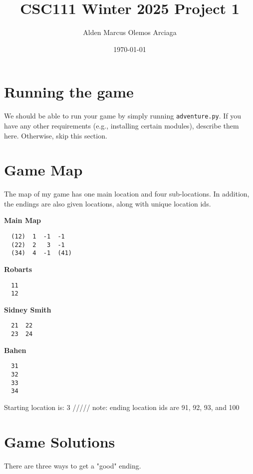\documentclass[11pt]{article}
\title{CSC111 Winter 2025 Project 1}
\author{Alden Marcus Olemos Arciaga}
\date{\today}
\begin{document}
\maketitle

\section*{Running the game}
We should be able to run your game by simply running \texttt{adventure.py}. If you have any other requirements (e.g., installing certain modules), describe them here. Otherwise, skip this section.

\section*{Game Map}
The map of my game has one main location and four sub-locations. In addition, the endings are also given locations, along with unique location ids.

\vspace{\baselineskip}

\begin{minipage}[t]{0.24\textwidth}
    \textbf{Main Map}
    \begin{verbatim}
  (12)  1  -1  -1
  (22)  2   3  -1
  (34)  4  -1  (41)
    \end{verbatim}
\end{minipage}%
\hfill
\begin{minipage}[t]{0.24\textwidth}
    \textbf{Robarts}
    \begin{verbatim}
  11
  12
    \end{verbatim}
\end{minipage}%
\hfill
\begin{minipage}[t]{0.24\textwidth}
    \textbf{Sidney Smith}
    \begin{verbatim}
  21  22
  23  24
    \end{verbatim}
\end{minipage}%
\hfill
\begin{minipage}[t]{0.24\textwidth}
    \textbf{Bahen}
    \begin{verbatim}
  31
  32
  33
  34
    \end{verbatim}
\end{minipage}

\noindent
Starting location is: 3 ///// note: ending location ids are 91, 92, 93, and 100

\section*{Game Solutions}
There are three ways to get a "good" ending.
\end{document}
